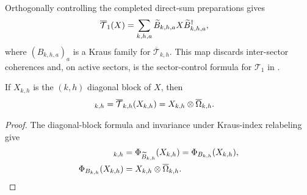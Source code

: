 \begin{definition}
    \label{def:mpdo_completed_omega_controlled_map}
    \leanok
    Orthogonally controlling the completed direct-sum preparations gives
    \begin{align}
        \overline{\mathcal T}_1(X)
         & =\sum_{k,h,a}\widetilde B_{k,h,a}X
        \widetilde B_{k,h,a}^{\dagger}, \notag
    \end{align}
    where $(B_{k,h,a})_a$ is a Kraus family for
    $\overline{\mathcal T}_{k,h}$. This map discards inter-sector coherences
    and, on active sectors, is the sector-control formula for $\mathcal T_1$
    in \cite[Appendix~C.2, lines~1523--1535]{Cirac2016MPDO_arXiv}.
\end{definition}

\begin{lemma}
    \label{thm:mpdo_completed_omega_controlled_map_same_block}
    \leanok
    If $X_{k,h}$ is the $(k,h)$ diagonal block of $X$, then
    \begin{align}
        [\overline{\mathcal T}_1(X)]_{k,h}
         & =\overline{\mathcal T}_{k,h}(X_{k,h})
        =X_{k,h}\otimes\overline\Omega_{k,h}. \notag
    \end{align}
\end{lemma}
\begin{proof}
    \leanok

    The diagonal-block formula and invariance under Kraus-index relabeling give
    \begin{align}
        [\overline{\mathcal T}_1(X)]_{k,h}
         & =\Phi_{\widetilde B_{k,h}}(X_{k,h})
        =\Phi_{B_{k,h}}(X_{k,h}), \notag                \\
        \Phi_{B_{k,h}}(X_{k,h})
         & =X_{k,h}\otimes\overline\Omega_{k,h}. \notag
    \end{align}
\end{proof}

